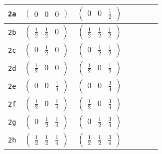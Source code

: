 \documentclass[fleqn,9pt,landscape]{jsarticle}
\begin{document}
\begin{center}
\begin{longtable}{ccccccc}
{\tt 2a} & $ \begin{pmatrix} 0 & 0 & 0 \end{pmatrix} $ & $ \begin{pmatrix} 0 & 0 & \frac{1}{2} \end{pmatrix} $ & $  $ & $  $ & $  $ & $  $ \\ \hline
{\tt 2b} & $ \begin{pmatrix} \frac{1}{2} & \frac{1}{2} & 0 \end{pmatrix} $ & $ \begin{pmatrix} \frac{1}{2} & \frac{1}{2} & \frac{1}{2} \end{pmatrix} $ & $  $ & $  $ & $  $ & $  $ \\ \hline
{\tt 2c} & $ \begin{pmatrix} 0 & \frac{1}{2} & 0 \end{pmatrix} $ & $ \begin{pmatrix} 0 & \frac{1}{2} & \frac{1}{2} \end{pmatrix} $ & $  $ & $  $ & $  $ & $  $ \\ \hline
{\tt 2d} & $ \begin{pmatrix} \frac{1}{2} & 0 & 0 \end{pmatrix} $ & $ \begin{pmatrix} \frac{1}{2} & 0 & \frac{1}{2} \end{pmatrix} $ & $  $ & $  $ & $  $ & $  $ \\ \hline
{\tt 2e} & $ \begin{pmatrix} 0 & 0 & \frac{1}{4} \end{pmatrix} $ & $ \begin{pmatrix} 0 & 0 & \frac{3}{4} \end{pmatrix} $ & $  $ & $  $ & $  $ & $  $ \\ \hline
{\tt 2f} & $ \begin{pmatrix} \frac{1}{2} & 0 & \frac{1}{4} \end{pmatrix} $ & $ \begin{pmatrix} \frac{1}{2} & 0 & \frac{3}{4} \end{pmatrix} $ & $  $ & $  $ & $  $ & $  $ \\ \hline
{\tt 2g} & $ \begin{pmatrix} 0 & \frac{1}{2} & \frac{1}{4} \end{pmatrix} $ & $ \begin{pmatrix} 0 & \frac{1}{2} & \frac{3}{4} \end{pmatrix} $ & $  $ & $  $ & $  $ & $  $ \\ \hline
{\tt 2h} & $ \begin{pmatrix} \frac{1}{2} & \frac{1}{2} & \frac{1}{4} \end{pmatrix} $ & $ \begin{pmatrix} \frac{1}{2} & \frac{1}{2} & \frac{3}{4} \end{pmatrix} $ & $  $ & $  $ & $  $ & $  $ \\ \hline

\end{longtable}
\end{center}
\end{document}
